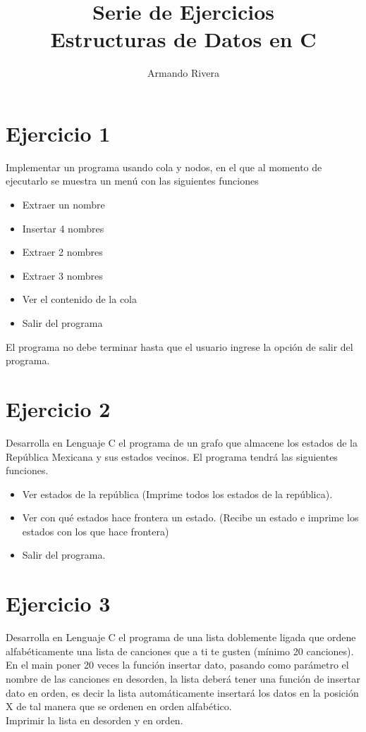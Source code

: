 \documentclass{article}
\author{Armando Rivera}
\title{Serie de Ejercicios\\Estructuras de Datos en C}
\begin{document}
	\maketitle
	\section{\textbf{Ejercicio 1}}  
	Implementar un programa usando cola y nodos, en el que al momento de ejecutarlo se muestra un menú con las siguientes funciones\\
	\begin{itemize}
		\item  Extraer un nombre  
		\item  Insertar 4 nombres  
		\item  Extraer 2 nombres  
		\item  Extraer 3 nombres  
		\item  Ver el contenido de la cola
		\item  Salir del programa		
	\end{itemize}
	El programa no debe terminar hasta que el usuario ingrese la opción de salir del programa.
	\section{\textbf{Ejercicio 2}}
	Desarrolla en Lenguaje C el programa de un grafo que almacene los estados de la República Mexicana y sus estados vecinos. El programa tendrá las siguientes funciones.
	\begin{itemize}
		\item Ver estados de la república (Imprime todos los estados de la república).
		\item Ver con qué estados hace frontera un estado. (Recibe un estado e imprime los estados con los que hace frontera)
		\item Salir del programa.
	\end{itemize}
	\section{\textbf{Ejercicio 3}}
	Desarrolla en Lenguaje C el programa de una lista doblemente ligada que ordene alfabéticamente una lista de canciones que a ti te gusten (mínimo 20 canciones).\\
	En el main poner 20 veces la función insertar dato, pasando como parámetro el nombre de las canciones en desorden,  la lista deberá tener una función de insertar dato en orden, es decir la lista automáticamente insertará los datos en la posición X de tal manera que se ordenen en orden alfabético.\\
	Imprimir la lista en desorden y en orden.
\end{document}
